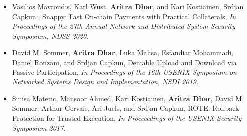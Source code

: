  \begin{itemize}
   \item Vasilios Mavroudis, Karl Wust, \textbf{Aritra Dhar}, and Kari Kostiainen, Srdjan Capkun:, Snappy: Fast On-chain Payments with Practical Collaterals, \emph{In Proceedings of the 27th Annual Network and Distributed System Security Symposium, NDSS 2020}. 
   \item David M. Sommer, \textbf{Aritra Dhar}, Luka Malisa, Esfandiar Mohammadi, Daniel Ronzani, and Srdjan Capkun, Deniable Upload and Download via Passive Participation, \emph{In Proceedings of the 16th USENIX Symposium on Networked Systems Design and Implementation, NSDI 2019}.
   \item Sinisa Matetic, Mansoor Ahmed, Kari Kostiainen, \textbf{Aritra Dhar}, David M. Sommer, Arthur Gervais, Ari Juels, and Srdjan Capkun, ROTE: Rollback Protection for Trusted Execution, \emph{In Proceeedings of the USENIX Security Symposium 2017}.
 \end{itemize}